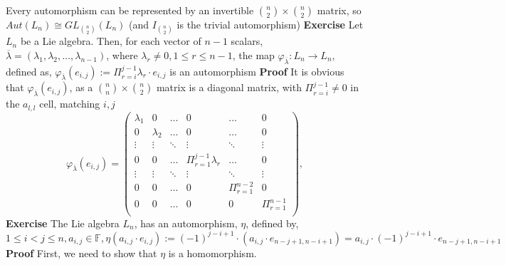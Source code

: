 \documentclass[12pt]{article}
\begin{document}
Every automorphism can be represented by an invertible $\binom{n}{2} \times \binom{n}{2}$ matrix, so $Aut(L_n) \cong GL_{\binom{n}{2}}(L_n)$ (and $I_{\binom{n}{2}}$ is the trivial automorphism) \newline
\newline
\textbf{Exercise} \newline
Let $L_n$ be a Lie algebra. Then, \newline for each vector of $n-1$ scalars, $\overline{\lambda}=(\lambda_1,\lambda_2,\dots,\lambda_{n-1})$, \newline
where $\lambda_r \neq 0,1 \leq r \leq n-1$, the map $\varphi_{\overline{\lambda}}:L_n \rightarrow L_n$, defined as, \newline
$\varphi_{\overline{\lambda}}(e_{i,j}):=\Pi_{r=i}^{j-1} \lambda_r \cdot e_{i,j}$ is an automorphism
\newline
\newline
\textbf{Proof} 
It is obvious that $\varphi_{\overline{\lambda}}(e_{i,j})$, as a $\binom{n}{n} \times \binom{n}{2}$ matrix is a diagonal matrix, with $\Pi_{r=i}^{j-1} \neq 0$ in the $a_{l,l}$ cell, matching $i,j$ \newline
$$
\varphi_{\overline{\lambda}}(e_{i,j})=\begin{pmatrix} 
	\lambda_1 & 0 & \dots & 0 & \dots & 0 \\
	0 & \lambda_2 & \dots & 0 & \dots & 0 \\
	\vdots & \vdots & \ddots & \vdots & \ddots & \vdots \\
	0 & 0 & \dots & \Pi_{r=1}^{j-1} \lambda_r  & \dots & 0 \\
	\vdots & \vdots & \ddots & \vdots & \ddots & \vdots \\
	0 & 0 & \dots & 0 & \Pi_{r=1}^{n-2} & 0 \\
	0 & 0 & \dots & 0 & 0 & \Pi_{r=1}^{n-1} \\
\end{pmatrix},
$$
\newline
\newline
\newline
\textbf{Exercise} The Lie algebra $L_n$, has an automorphism, $\eta$, defined by, \newline
$1 \leq i<j \leq n,a_{i,j} \in \mathbb{F},\eta(a_{i,j} \cdot e_{i,j}):=(-1)^{j-i+1} \cdot (a_{i,j} \cdot e_{n-j+1,n-i+1})=
a_{i,j} \cdot (-1)^{j-i+1} \cdot e_{n-j+1,n-i+1}$ \newline
\textbf{Proof} \newline
First, we need to show that $\eta$ is a homomorphism. \newline
\end{document}
